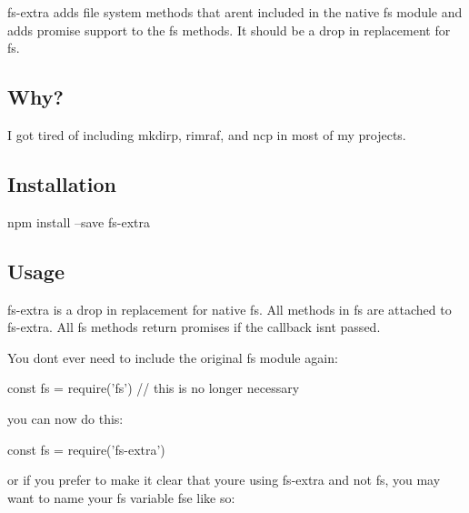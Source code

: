 {\ttfamily fs-\/extra} adds file system methods that aren\textquotesingle{}t included in the native {\ttfamily fs} module and adds promise support to the {\ttfamily fs} methods. It should be a drop in replacement for {\ttfamily fs}.

\href{https://www.npmjs.org/package/fs-extra}{\tt } \href{http://travis-ci.org/jprichardson/node-fs-extra}{\tt } \href{https://ci.appveyor.com/project/jprichardson/node-fs-extra/branch/master}{\tt } \href{https://www.npmjs.org/package/fs-extra}{\tt } \href{https://coveralls.io/r/jprichardson/node-fs-extra}{\tt }

\href{https://github.com/feross/standard}{\tt }

\subsection*{Why? }

I got tired of including {\ttfamily mkdirp}, {\ttfamily rimraf}, and {\ttfamily ncp} in most of my projects.

\subsection*{Installation }

\begin{DoxyVerb}npm install --save fs-extra
\end{DoxyVerb}


\subsection*{Usage }

{\ttfamily fs-\/extra} is a drop in replacement for native {\ttfamily fs}. All methods in {\ttfamily fs} are attached to {\ttfamily fs-\/extra}. All {\ttfamily fs} methods return promises if the callback isn\textquotesingle{}t passed.

You don\textquotesingle{}t ever need to include the original {\ttfamily fs} module again\+:


\begin{DoxyCode}
const fs = require('fs') // this is no longer necessary
\end{DoxyCode}


you can now do this\+:


\begin{DoxyCode}
const fs = require('fs-extra')
\end{DoxyCode}


or if you prefer to make it clear that you\textquotesingle{}re using {\ttfamily fs-\/extra} and not {\ttfamily fs}, you may want to name your {\ttfamily fs} variable {\ttfamily fse} like so\+:


